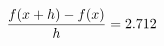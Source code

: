 \documentclass[preview]{standalone}
\begin{document}
\begin{align*}
\special{dvisvgm:raw <g id='unique000'>}\frac{f(x+h)-f(x)}{h} = 2.712\special{dvisvgm:raw </g>}
\end{align*}
\end{document}
